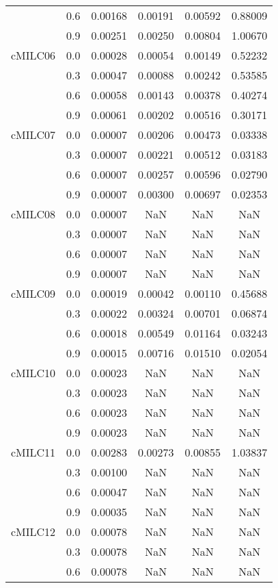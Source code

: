 \begin{longtable}{cccccc}
        & 0.6 & 0.00168 & 0.00191 & 0.00592 & 0.88009 \\
        & 0.9 & 0.00251 & 0.00250 & 0.00804 & 1.00670 \\
cMILC06 & 0.0 & 0.00028 & 0.00054 & 0.00149 & 0.52232 \\
        & 0.3 & 0.00047 & 0.00088 & 0.00242 & 0.53585 \\
        & 0.6 & 0.00058 & 0.00143 & 0.00378 & 0.40274 \\
        & 0.9 & 0.00061 & 0.00202 & 0.00516 & 0.30171 \\
cMILC07 & 0.0 & 0.00007 & 0.00206 & 0.00473 & 0.03338 \\
        & 0.3 & 0.00007 & 0.00221 & 0.00512 & 0.03183 \\
        & 0.6 & 0.00007 & 0.00257 & 0.00596 & 0.02790 \\
        & 0.9 & 0.00007 & 0.00300 & 0.00697 & 0.02353 \\
cMILC08 & 0.0 & 0.00007 & NaN & NaN & NaN \\
        & 0.3 & 0.00007 & NaN & NaN & NaN \\
        & 0.6 & 0.00007 & NaN & NaN & NaN \\
        & 0.9 & 0.00007 & NaN & NaN & NaN \\
cMILC09 & 0.0 & 0.00019 & 0.00042 & 0.00110 & 0.45688 \\
        & 0.3 & 0.00022 & 0.00324 & 0.00701 & 0.06874 \\
        & 0.6 & 0.00018 & 0.00549 & 0.01164 & 0.03243 \\
        & 0.9 & 0.00015 & 0.00716 & 0.01510 & 0.02054 \\
cMILC10 & 0.0 & 0.00023 & NaN & NaN & NaN \\
        & 0.3 & 0.00023 & NaN & NaN & NaN \\
        & 0.6 & 0.00023 & NaN & NaN & NaN \\
        & 0.9 & 0.00023 & NaN & NaN & NaN \\
cMILC11 & 0.0 & 0.00283 & 0.00273 & 0.00855 & 1.03837 \\
        & 0.3 & 0.00100 & NaN & NaN & NaN \\
        & 0.6 & 0.00047 & NaN & NaN & NaN \\
        & 0.9 & 0.00035 & NaN & NaN & NaN \\
cMILC12 & 0.0 & 0.00078 & NaN & NaN & NaN \\
        & 0.3 & 0.00078 & NaN & NaN & NaN \\
        & 0.6 & 0.00078 & NaN & NaN & NaN \\

\end{longtable}
